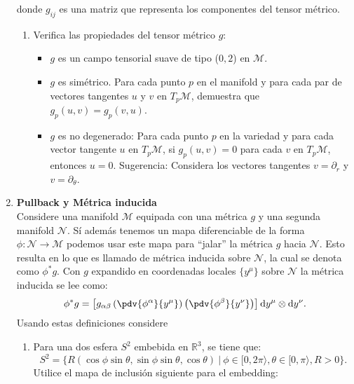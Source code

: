 \documentclass[../main]{subfiles}
\begin{document}
\begin{enumerate}
    donde $g_{ij}$ es una matriz que representa los componentes del tensor métrico.
    \begin{enumerate}[label=(\alph*)]
        \item Verifica las propiedades del tensor métrico $g$:
        \begin{itemize}
            \item $g$ es un campo tensorial suave de tipo ($0, 2$) en $\mathcal{M}$.
            \item $g$ es simétrico. Para cada punto $p$ en el manifold y para cada par de vectores tangentes $u$ y $v$ en $T_p \mathcal{M}$, demuestra que $g_p(u,v)=g_p(v, u)$.
            \item $g$ es no degenerado: Para cada punto $p$ en la variedad y para cada vector tangente $u$ en $T_p\mathcal{M}$, si $g_p(u, v)=0$ para cada $v$ en $T_p\mathcal{M}$, entonces $u=0$. Sugerencia: Considera los vectores tangentes $v=\partial_r$ y $v=\partial_{\theta}$.
        \end{itemize}
    \end{enumerate}
    \item \textbf{Pullback y Métrica inducida}\\
    Considere una manifold $\mathcal{M}$ equipada con una métrica $g$ y una segunda manifold $\mathcal{N}$. Sí además tenemos un mapa diferenciable de la forma $\phi: \mathcal{N}\rightarrow \mathcal{M}$ podemos usar este mapa para ``jalar'' la métrica $g$ hacia $\mathcal{N}$. Esto resulta en lo que es llamado de métrica inducida sobre $\mathcal{N}$, la cual se denota como $\phi^* g$. Con $g$ expandido en coordenadas locales $\{ y^{\mu}\}$ sobre $\mathcal{N}$ la métrica inducida se lee como:
    \begin{equation}
        \phi^* g=\left[g_{\alpha\beta}\left(\pdv{\phi^{\alpha}}{y^{\mu}}\right)\left(\pdv{\phi^{\beta}}{y^{\nu}}\right)\right]\mathrm{d}y^{\mu}\otimes \mathrm{d}y^{\nu}.
    \end{equation}
    Usando estas definiciones considere
    \begin{enumerate}[label=(\alph*)]
        \item Para una dos esfera $S^2$ embebida en $\mathbb{R}^3$, se tiene que:
        \begin{equation}
            S^2=\{R(\cos \phi\sin \theta, \sin \phi\sin \theta, \cos \theta) \ | \ \phi \in [0, 2\pi\rangle, \theta \in [0, \pi\rangle, R>0\}.
        \end{equation}
        Utilice el mapa de inclusión siguiente para el embedding:

\end{enumerate}
\end{enumerate}
\end{document}
